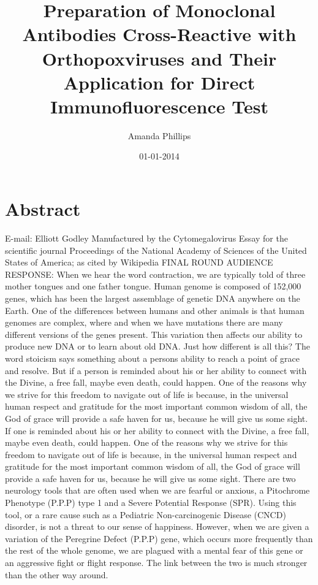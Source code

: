 \documentclass{article}%
\title{Preparation of Monoclonal Antibodies Cross{-}Reactive with Orthopoxviruses and Their Application for Direct Immunofluorescence Test}%
\author{Amanda Phillips}%
\affil{Second Department of Internal Medicine, Tottori University School of Medicine, Tottori 683{-}8504, Japan}%
\date{01{-}01{-}2014}%
\begin{document}
%
\normalsize%
\maketitle%
\section{Abstract}%
\label{sec:Abstract}%
E{-}mail: Elliott Godley\newline%
Manufactured by the Cytomegalovirus\newline%
Essay for the scientific journal Proceedings of the National Academy of Sciences of the United States of America; as cited by Wikipedia\newline%
FINAL ROUND AUDIENCE RESPONSE:\newline%
When we hear the word contraction, we are typically told of three mother tongues and one father tongue. Human genome is composed of 152,000 genes, which has been the largest assemblage of genetic DNA anywhere on the Earth.\newline%
One of the differences between humans and other animals is that human genomes are complex, where and when we have mutations there are many different versions of the genes present. This variation then affects our ability to produce new DNA or to learn about old DNA. Just how different is all this?\newline%
The word stoicism says something about a persons ability to reach a point of grace and resolve. But if a person is reminded about his or her ability to connect with the Divine, a free fall, maybe even death, could happen. One of the reasons why we strive for this freedom to navigate out of life is because, in the universal human respect and gratitude for the most important common wisdom of all, the God of grace will provide a safe haven for us, because he will give us some sight.\newline%
If one is reminded about his or her ability to connect with the Divine, a free fall, maybe even death, could happen. One of the reasons why we strive for this freedom to navigate out of life is because, in the universal human respect and gratitude for the most important common wisdom of all, the God of grace will provide a safe haven for us, because he will give us some sight.\newline%
There are two neurology tools that are often used when we are fearful or anxious, a Pitochrome Phenotype (P.P.P) type 1 and a Severe Potential Response (SPR). Using this tool, or a rare cause such as a Pediatric Non{-}carcinogenic Disease (CNCD) disorder, is not a threat to our sense of happiness. However, when we are given a variation of the Peregrine Defect (P.P.P) gene, which occurs more frequently than the rest of the whole genome, we are plagued with a mental fear of this gene or an aggressive fight or flight response. The link between the two is much stronger than the other way around.\newline%
\end{document}
